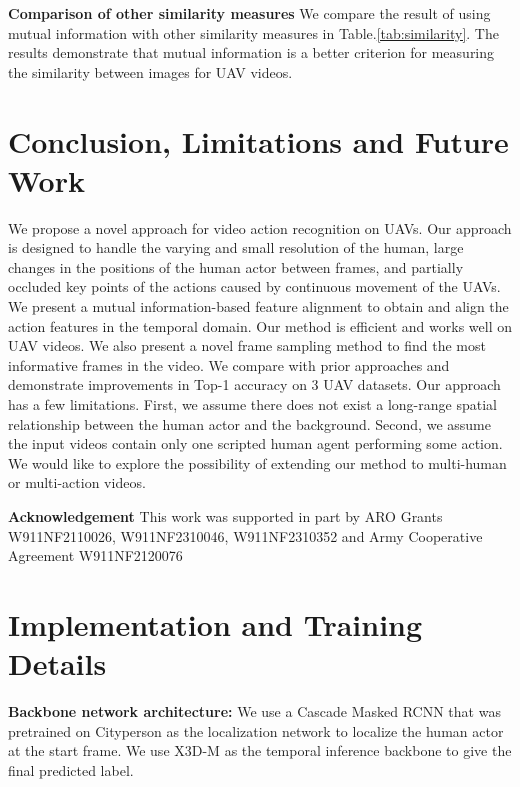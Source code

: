 \documentclass[10pt,twocolumn,letterpaper]{article}
\begin{document}
{\textbf{Comparison of other similarity measures}
We compare the result of using mutual information with other similarity measures in Table.\ref{tab:similarity}. The results demonstrate that mutual information is a better criterion for measuring the similarity between images for UAV videos.

%
 \section{Conclusion, Limitations and Future Work}
We propose a novel approach for video action recognition on UAVs. Our approach is designed to handle the varying and small resolution of the human, large changes in the positions of the human actor between frames, and partially occluded key points of the actions caused by continuous movement of the UAVs.  We present a mutual information-based feature alignment to obtain and align the action features in the temporal domain. Our method is efficient and works well on UAV videos. We also present a novel frame sampling method to find the most informative frames in the video. We compare with prior approaches and demonstrate improvements in Top-1 accuracy on 3 UAV datasets. Our approach has a few limitations. First, we assume there does not exist a long-range spatial relationship between the human actor and the background. Second, we assume the input videos contain only one scripted human agent performing some action. We would like to explore the possibility of extending our method to multi-human or multi-action videos. 


\textbf{Acknowledgement} This work was supported in part by ARO Grants W911NF2110026, W911NF2310046,  W911NF2310352  and Army Cooperative Agreement W911NF2120076
\label{sec:conclusion}

 
{\small


}

\clearpage
\appendix
\label{sec:appendix}


\section{Implementation and Training Details}\label{sec:imple}

\noindent  \textbf{Backbone network architecture:} We use a Cascade Masked RCNN\cite{hasan2021generalizable} that was pretrained on Cityperson\cite{Zhang2017CityPersonsAD} as the localization network to localize the human actor at the start frame. We use X3D-M\cite{feichtenhofer2020x3d} as the temporal inference backbone to give the final predicted label.

}
\end{document}
